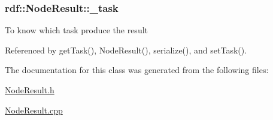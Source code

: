 \subsubsection[{\texorpdfstring{\+\_\+task}{_task}}]{ rdf\+::\+Node\+Result\+::\+\_\+task\hspace{0.3cm}{\ttfamily [private]}}\hypertarget{classrdf_1_1NodeResult_aa628e795914de688be784892e147fd2d}{}\label{classrdf_1_1NodeResult_aa628e795914de688be784892e147fd2d}
To know which task produce the result 

Referenced by get\+Task(), Node\+Result(), serialize(), and set\+Task().



The documentation for this class was generated from the following files\+:\begin{DoxyCompactItemize}
\item 
\hyperlink{NodeResult_8h}{Node\+Result.\+h}\item 
\hyperlink{NodeResult_8cpp}{Node\+Result.\+cpp}\end{DoxyCompactItemize}
